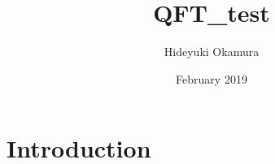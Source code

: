 \documentclass{article}
\title{QFT_test}
\author{Hideyuki Okamura}
\date{February 2019}
\begin{document}
\maketitle

\section{Introduction}
\end{document}
